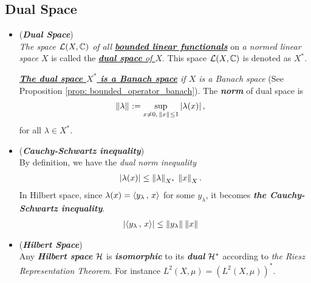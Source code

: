 \documentclass[11pt]{article}
\begin{document}
\subsection{Dual Space}
\begin{itemize}
\item \begin{definition} (\emph{\textbf{Dual Space}})\\
\emph{The space ${\mathcal L}(X, {\mathbb C})$ of all \underline{\textbf{bounded linear functionals}}} on \emph{a normed linear space} $X$ is called the \underline{\emph{\textbf{dual space} of $X$}}. This space ${\mathcal L}(X, {\mathbb C})$ is denoted as $X^{*}$.

\emph{\underline{\textbf{The dual space $X^{*}$ is a Banach space}} if $X$ is a Banach space} (See Proposition \ref{prop: bounded_operator_banach}). The \emph{\textbf{norm}} of dual space is 
\begin{align*}
\left\|\lambda\right\|_{} &:= \sup_{x \neq 0, \, \left\|x\right\|_{} \le 1} \left\lvert \lambda(x) \right\rvert,
\end{align*} for all $\lambda \in X^{*}$.
\end{definition}

\item \begin{remark} (\emph{\textbf{Cauchy-Schwartz inequality}})\\
By definition, we have the \emph{dual norm inequality} 
\begin{align}
\left\lvert \lambda(x) \right\rvert &\le \left\|\lambda\right\|_{X^{*}}\,\left\|x\right\|_{X}. \label{eqn: dual_norm_inequality}
\end{align} In Hilbert space, since $\lambda(x) = \left\langle y_{\lambda}\,,\, x \right\rangle$ for some $y_{\lambda}$, it becomes \emph{\textbf{the Cauchy-Schwartz inequality}}.
\begin{align*}
\left\lvert \left\langle y_{\lambda}\,,\, x \right\rangle \right\rvert &\le \left\|y_{\lambda}\right\|_{}\left\|x\right\|_{}
\end{align*}
\end{remark}

\item \begin{example} (\textbf{\emph{Hilbert Space}})\\
Any \emph{\textbf{Hilbert space}} ${\mathcal H}$ is \emph{\textbf{isomorphic}} to its \emph{\textbf{dual}} ${\mathcal H}^{*}$ according to \emph{the Riesz Representation Theorem}. For instance $L^2(X, \mu) = (L^2(X, \mu))^{*}$.
\end{example}


\end{itemize}
\end{document}
